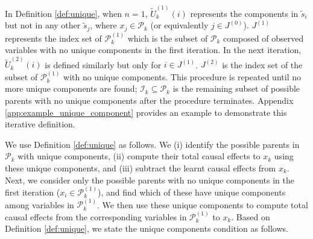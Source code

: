\documentclass[12pt]{article}
\begin{document}
\vspace{-2mm}
In Definition \ref{def:unique}, when $n=1$, $\tilde{U}_{k}^{(1)}(i)$ represents the components in $\tilde{s}_i$ but not in any other $\tilde{s}_j$, where $x_j\in\mathcal{P}_k$ (or equivalently $j\in J^{(0)}$). $J^{(1)}$ represents the index set of $\mathcal{P}_k^{(1)}$ which is the subset of $\mathcal{P}_k$ composed of observed variables with no unique components in the first iteration. In the next iteration, $\tilde{U}_k^{(2)}(i)$ is defined similarly but only for $i\in J^{(1)}$. $J^{(2)}$ is the index set of the subset of $\mathcal{P}_k^{(1)}$ with no unique components. This procedure is repeated until no more unique components are found; $\mathcal{I}_k \subseteq \mathcal{P}_k$ is the remaining subset of possible parents with no unique components after the procedure terminates. Appendix \ref{app:example_unique_component} provides an example to demonstrate this iterative definition. 

We use Definition \ref{def:unique} as follows. We (i) identify the possible parents in $\mathcal{P}_k$ with unique components, (ii) compute their total causal effects to $x_k$ using these unique components, and (iii) subtract the learnt causal effects from $x_k$. Next, we consider only the possible parents with no unique components in the first iteration ($x_i\in\mathcal{P}_k^{(1)}$), and find which of these have unique components among variables in $\mathcal{P}_k^{(1)}$. We then use these unique components to compute total causal effects from the corresponding variables in $\mathcal{P}_k^{(1)}$ to $x_k$. Based on Definition \ref{def:unique}, we state the unique components condition as follows.
\end{document}
